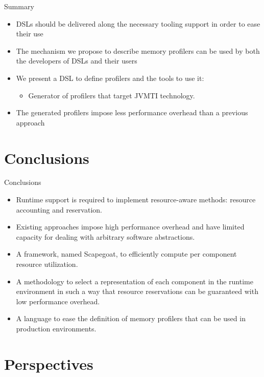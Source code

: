 \documentclass[10pt,xcolor={dvipsnames}]{beamer}
\begin{document}
	\begin{frame}{Summary}
		\begin{itemize}\setlength{\itemsep}{1cm}
			\item DSLs should be delivered along the necessary tooling support in order to ease their use
			\item The mechanism we propose to describe memory profilers can be used by both the developers of DSLs and their users 
			\item We present a DSL to define profilers and the tools to use it:
			\vspace{0.5cm}
			\begin{itemize}\setlength{\itemsep}{0.5cm}
				\item Generator of profilers that target JVMTI technology.
			\end{itemize}
			\item The generated profilers impose less performance overhead than a previous approach
		\end{itemize}
		\vfill
	\end{frame}
	
	\section[Conclusions]{Conclusions}
	
	\begin{frame}{Conclusions}
		\begin{itemize}\setlength{\itemsep}{0.6cm}
			\item Runtime support is required to implement resource-aware methods: resource accounting and reservation.
			\item Existing approaches impose high performance overhead and have limited capacity for dealing with arbitrary software abstractions.
			\item A framework, named Scapegoat, to efficiently compute per component resource utilization.
			\item A methodology to select a representation of each component in the runtime environment in such a way that resource reservations can be guaranteed with low performance overhead.
			\item A language to ease the definition of memory profilers that can be used in production environments.
		\end{itemize}
	\end{frame}
	
	\section[Perspectives]{Perspectives}
\end{document}
